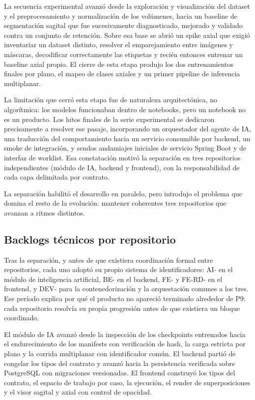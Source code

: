 La secuencia experimental avanzó desde la exploración y visualización del dataset y el preprocesamiento y normalización de los volúmenes, hacia un baseline de segmentación sagital que fue sucesivamente diagnosticado, mejorado y validado contra un conjunto de retención. Sobre esa base se abrió un spike axial que exigió inventariar un dataset distinto, resolver el emparejamiento entre imágenes y máscaras, decodificar correctamente las etiquetas y recién entonces entrenar un baseline axial propio. El cierre de esta etapa produjo los dos entrenamientos finales por plano, el mapeo de clases axiales y un primer pipeline de inferencia multiplanar.

La limitación que cerró esta etapa fue de naturaleza arquitectónica, no algorítmica: los modelos funcionaban dentro de notebooks, pero un notebook no es un producto. Los hitos finales de la serie experimental se dedicaron precisamente a resolver ese pasaje, incorporando un orquestador del agente de IA, una traducción del comportamiento hacia un servicio consumible por backend, un smoke de integración, y sendos andamiajes iniciales de servicio Spring Boot y de interfaz de worklist. Esa constatación motivó la separación en tres repositorios independientes (módulo de IA, backend y frontend), con la responsabilidad de cada capa delimitada por contrato.

La separación habilitó el desarrollo en paralelo, pero introdujo el problema que domina el resto de la evolución: mantener coherentes tres repositorios que avanzan a ritmos distintos.

\subsection{Backlogs técnicos por repositorio}
\label{anexo:f-backlogs-repositorios}

Tras la separación, y antes de que existiera coordinación formal entre repositorios, cada uno adoptó su propio sistema de identificadores: AI- en el módulo de inteligencia artificial, BE- en el backend, FE- y FE-RD- en el frontend, y DEV- para la contenedorización y la orquestación comunes a los tres. Ese período explica por qué el producto no apareció terminado alrededor de P9: cada repositorio resolvía su propia progresión antes de que existiera un bloque coordinado.

El módulo de IA avanzó desde la inspección de los checkpoints entrenados hacia el endurecimiento de los manifests con verificación de hash, la carga estricta por plano y la corrida multiplanar con identificador común. El backend partió de congelar los tipos del contrato y avanzó hacia la persistencia verificada sobre PostgreSQL con migraciones versionadas. El frontend construyó los tipos del contrato, el espacio de trabajo por caso, la ejecución, el render de superposiciones y el visor sagital y axial con control de opacidad.


